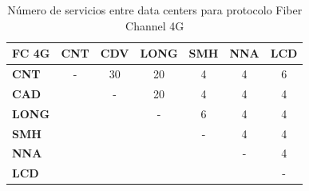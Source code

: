  \begin{table}[H]
   \centering
   \begin{tabular}{| l | c | c | c | c | c | c |}
     \hline
     \textbf{FC 4G} & \textbf{CNT} & \textbf{CDV} & \textbf{LONG} & \textbf{SMH} & \textbf{NNA} & \textbf{LCD} \\
     \hline
     \textbf{CNT}  & - & 30 & 20 & 4 & 4 & 6 \\
     \hline
     \textbf{CAD}  &   & - & 20 & 4 & 4 & 4 \\
     \hline
     \textbf{LONG} &   &   & - & 6 & 4 & 4 \\
     \hline
     \textbf{SMH}  &   &   &   & - & 4 & 4 \\
     \hline
     \textbf{NNA}  &   &   &   &   & - & 4 \\
     \hline
     \textbf{LCD}  &   &   &   &   &   & - \\
     \hline
   \end{tabular}
   \caption{Número de servicios entre data centers para protocolo Fiber Channel 4G}
   \label{tab:FC4G}
 \end{table}
